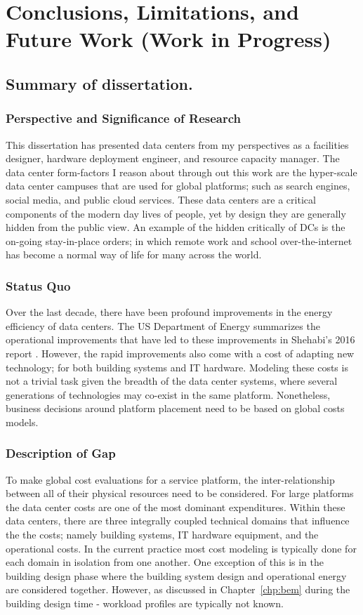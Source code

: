 \chapter{Conclusions, Limitations, and Future Work (Work in Progress)}
\label{chp:conclusions}

\section{Summary of dissertation.}

\subsection{Perspective and Significance of Research}
This dissertation has presented data centers from my perspectives as a facilities designer, hardware deployment engineer, and resource capacity manager. The data center form-factors I reason about through out this work are the hyper-scale data center campuses that are used for global platforms; such as search engines, social media, and public cloud services. These data centers are a critical components of the modern day lives of people, yet by design they are generally hidden from the public view. An example of the hidden critically of DCs is the on-going stay-in-place orders; in which remote work and school over-the-internet has become a normal way of life for many across the world. 

\subsection{Status Quo}
Over the last decade, there have been profound improvements in the energy efficiency of data centers. The US Department of Energy summarizes the operational improvements that have led to these improvements in Shehabi's 2016 report \cite{Shehabi16}. However, the rapid improvements also come with a cost of adapting new technology; for both building systems and IT hardware. Modeling these costs is not a trivial task given the breadth of the data center systems, where several generations of technologies may co-exist in the same platform. Nonetheless, business decisions around platform placement need to be based on global costs models. 

\subsection{Description of Gap}
To make global cost evaluations for a service platform, the inter-relationship between all of their physical resources need to be considered. For large platforms the data center costs are one of the most dominant expenditures. Within these data centers, there are three integrally coupled technical domains that influence the the costs; namely building systems, IT hardware equipment, and the operational costs. In the current practice most cost modeling is typically done for each domain in isolation from one another. One exception of this is in the building design phase where the building system design and operational energy are considered together. However, as discussed in Chapter~\ref{chp:bem} during the building design time - workload profiles are typically not known. 

